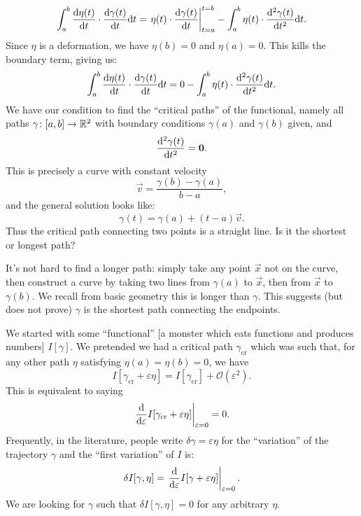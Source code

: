 \begin{equation}
  \int^{b}_{a} \frac{\mathrm{d}\eta(t)}{\mathrm{d} t}\cdot\frac{\mathrm{d}\gamma(t)}{\mathrm{d} t}\mathrm{d} t
  = \left.\eta(t)\cdot\frac{\mathrm{d}\gamma(t)}{\mathrm{d} t}\right|^{t=b}_{t=a}
  -\int^{b}_{a} \eta(t)\cdot\frac{\mathrm{d}^{2}\gamma(t)}{\mathrm{d} t^{2}}\mathrm{d} t.
\end{equation}
Since $\eta$ is a deformation, we have $\eta(b)=0$ and $\eta(a)=0$. This
kills the boundary term, giving us:
\begin{equation}
  \int^{b}_{a} \frac{\mathrm{d}\eta(t)}{\mathrm{d} t}\cdot\frac{\mathrm{d}\gamma(t)}{\mathrm{d} t}\mathrm{d} t
  = 0 - \int^{b}_{a} \eta(t)\cdot\frac{\mathrm{d}^{2}\gamma(t)}{\mathrm{d} t^{2}}\mathrm{d} t.
\end{equation}
We have our condition to find the ``critical paths'' of the functional,
namely all paths $\gamma\colon[a,b]\to\mathbb{R}^{2}$ with boundary conditions
$\gamma(a)$ and $\gamma(b)$ given, and
\begin{equation}
\frac{\mathrm{d}^{2}\gamma(t)}{\mathrm{d} t^{2}} = \boldsymbol{0}.
\end{equation}
This is precisely a curve with constant velocity
\begin{equation}
\vec{v} = \frac{\gamma(b) - \gamma(a)}{b - a},
\end{equation}
and the general solution looks like:
\begin{equation}
\gamma(t) = \gamma(a) + (t - a)\vec{v}.
\end{equation}
Thus the critical path connecting two points is a straight line. Is it
the shortest or longest path?

It's not hard to find a longer path: simply take any point $\vec{x}$ not on the
curve, then construct a curve by taking two lines from $\gamma(a)$ to
$\vec{x}$, then from $\vec{x}$ to $\gamma(b)$. We recall from basic
geometry this is longer than $\gamma$. This suggests (but does not
prove) $\gamma$ is the shortest path connecting the endpoints.

We started with some ``functional'' [a monster which eats functions and
  produces numbers]
$I[\gamma]$. We pretended we had a critical path $\gamma_{\text{cr}}$
which was such that, for any other path $\eta$ satisfying
$\eta(a)=\eta(b)=0$, we have
\begin{equation}
I[\gamma_{\text{cr}} + \varepsilon\eta] = I[\gamma_{\text{cr}}] + \mathcal{O}(\varepsilon^{2}).
\end{equation}
This is equivalent to saying
\begin{equation}
\left.\frac{\mathrm{d}}{\mathrm{d}\varepsilon}I[\gamma_{\text{cr}} + \varepsilon\eta]\right|_{\varepsilon=0}=0.
\end{equation}
Frequently, in the literature, people write
$\delta\gamma=\varepsilon\eta$ for the ``variation'' of the trajectory
$\gamma$ and the ``first variation'' of $I$ is:
\begin{equation}
\delta I[\gamma,\eta] = 
\left.\frac{\mathrm{d}}{\mathrm{d}\varepsilon}I[\gamma + \varepsilon\eta]\right|_{\varepsilon=0}.
\end{equation}
We are looking for $\gamma$ such that $\delta I[\gamma,\eta]=0$ for any
arbitrary $\eta$.


